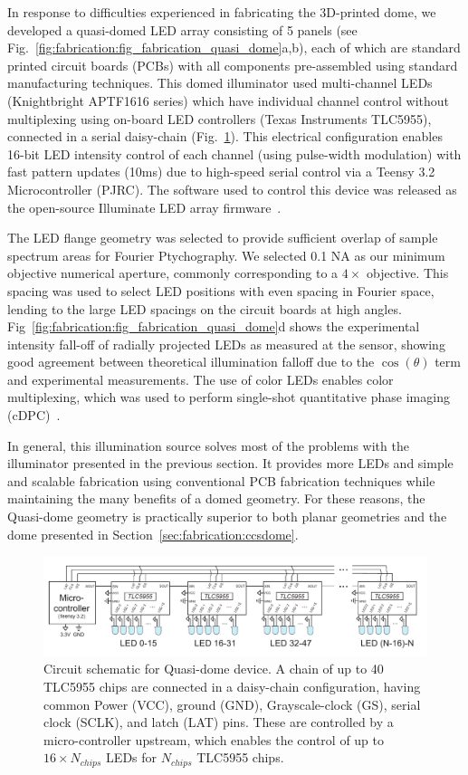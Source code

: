 In response to difficulties experienced in fabricating the 3D-printed dome, we developed a quasi-domed LED array consisting of 5 panels (see Fig.~\ref{fig:fabrication:fig_fabrication_quasi_dome}a,b), each of which are standard printed circuit boards (PCBs) with all components pre-assembled using standard manufacturing techniques. This domed illuminator used multi-channel LEDs (Knightbright APTF1616 series) which have individual channel control without multiplexing using on-board LED controllers (Texas Instruments TLC5955), connected in a serial daisy-chain (Fig.~\ref{fig:fabrication_dome_circuit}). This electrical configuration enables 16-bit LED intensity control of each channel (using pulse-width modulation) with fast pattern updates (10ms) due to high-speed serial control via a Teensy 3.2 Microcontroller (PJRC). The software used to control this device was released as the open-source Illuminate LED array firmware~\cite{illuminate}.

The LED flange geometry was selected to provide sufficient overlap of sample spectrum areas for Fourier Ptychography. We selected 0.1 NA as our minimum objective numerical aperture, commonly corresponding to a $4\times$ objective. This spacing was used to select LED positions with even spacing in Fourier space, lending to the large LED spacings on the circuit boards at high angles. Fig~\ref{fig:fabrication:fig_fabrication_quasi_dome}d shows the experimental intensity fall-off of radially projected LEDs as measured at the sensor, showing good agreement between theoretical illumination falloff due to the $\cos(\theta)$ term and experimental measurements. The use of color LEDs enables color multiplexing, which was used to perform single-shot quantitative phase imaging (cDPC)~\cite{PhillipsChen17cDPC}.

In general, this illumination source solves most of the problems with the illuminator presented in the previous section. It provides more LEDs and simple and scalable fabrication using conventional PCB fabrication techniques while maintaining the many benefits of a domed geometry. For these reasons, the Quasi-dome geometry is practically superior to both planar geometries and the dome presented in Section~\ref{sec:fabrication:ccsdome}.

\begin{figure}
    \centering
    \includegraphics[width=\textwidth]{figures/fig_fabrication_slow_circuit.pdf}
    \caption{Circuit schematic for Quasi-dome device. A chain of up to 40 TLC5955 chips are connected in a daisy-chain configuration, having common Power (VCC), ground (GND), Grayscale-clock (GS), serial clock (SCLK), and latch (LAT) pins. These are controlled by a micro-controller upstream, which enables the control of up to $16 \times N_{chips}$ LEDs for $N_{chips}$ TLC5955 chips.}\label{fig:fabrication_dome_circuit}
\end{figure}

